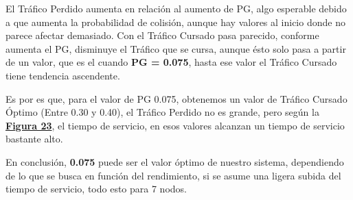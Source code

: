 \documentclass{article}
\begin{document}
\quad

El Tráfico Perdido aumenta en relación al aumento de PG, algo esperable debido a que aumenta la probabilidad de colisión, aunque hay valores al inicio donde no parece afectar demasiado. Con el Tráfico Cursado pasa parecido, conforme aumenta el PG, disminuye el Tráfico que se cursa, aunque ésto solo pasa a partir de un valor, que es el cuando \textbf{PG = 0.075}, hasta ese valor el Tráfico Cursado tiene tendencia ascendente. 

Es por es que, para el valor de PG 0.075, obtenemos un valor de Tráfico Cursado Óptimo (Entre 0.30 y 0.40), el Tráfico Perdido no es grande, pero según la \hyperref[fig:TSvsTC]{\textbf{Figura 23}}, el tiempo de servicio, en esos valores alcanzan un tiempo de servicio bastante alto.

\quad

En conclusión, \textbf{0.075} puede ser el valor óptimo de nuestro sistema, dependiendo de lo que se busca en función del rendimiento, si se asume una ligera subida del tiempo de servicio, todo esto para 7 nodos.
\end{document}
